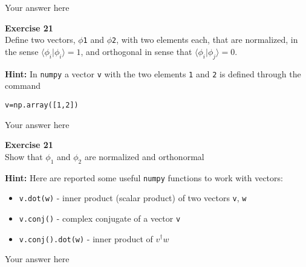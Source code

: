 \documentclass{article}
\begin{document}
Your answer here

\begin{mdframed}
\textbf{Exercise 21}\\
Define two vectors, \texttt{$\phi$1} and \texttt{$\phi$2}, with two elements each, that are normalized, in the sense $\langle\phi_i|\phi_i\rangle=1$, and orthogonal in sense that $\langle\phi_i|\phi_j\rangle=0$.

\textbf{Hint:} In \texttt{numpy} a vector \texttt{v} with the two elements \texttt{1} and \texttt{2} is defined through the command

\begin{verbatim}
v=np.array([1,2])
\end{verbatim}
\end{mdframed}

Your answer here

\begin{mdframed}
\textbf{Exercise 21}\\
Show that $\phi_1$ and $\phi_2$ are normalized and orthonormal

\textbf{Hint:} Here are reported some useful \texttt{numpy} functions to work with vectors:

\begin{itemize}
\item \texttt{v.dot(w)} - inner product (scalar product) of two vectors \texttt{v}, \texttt{w}
\item \texttt{v.conj()} - complex conjugate of a vector \texttt{v}
\item \texttt{v.conj().dot(w)} - inner product of $v^\dagger w$
\end{itemize}
\end{mdframed}

Your answer here


\clearpage
\end{document}
